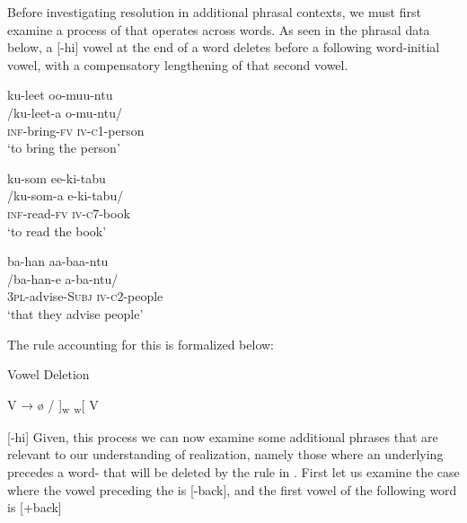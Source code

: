 \documentclass[output=paper,modfonts,nonflat,
 hidelinks
]{langsci/langscibook}
\begin{document}
Before investigating  resolution in additional phrasal contexts, we must first examine a process of  that operates across words. As seen in the phrasal data below, a [-hi] vowel at the end of a word deletes before a following word-initial vowel, with a compensatory lengthening of that second vowel.


\ea\label{ex:bickmore:16}
\ea\label{ex:bickmore:16a}
\glll ku-leet oo-muu-ntu  \\
      /ku-leet-a o-mu-ntu/\\
  \textsc{inf-}\textup{bring}\textsc{{}-fv} \textsc{iv-c1-}\textup{person}\\
\glt      ‘to bring the person’

\ex\label{ex:bickmore:16b}
\glll ku-som ee-ki-tabu\\        
/ku-som-a e-ki-tabu/\\
\textsc{inf-}\textup{read}\textsc{{}-fv} \textsc{iv-c7-}\textup{book}\\
\glt      ‘to read the book’

\ex\label{ex:bickmore:16c}
\glll ba-han aa-baa-ntu\\
/ba-han-e a-ba-ntu/\\
\textsc{3pl-}\textup{advise}\textsc{{}-Subj} \textsc{iv-c2-}\textup{people}\\
\glt      ‘that they advise people’
\z
\z

The rule accounting for this is formalized below:

\ea\label{ex:bickmore:17}
Vowel Deletion%
%

         V → ø / \underline{ }\underline{ }\underline{ } ]\textsubscript{w} \textsubscript{w}[ V  

      [-hi]
\z
Given, this process we can now examine some additional phrases that are relevant to our understanding of  realization, namely those where an underlying  precedes a word- that will be deleted by the rule in . First let us examine the case where the vowel preceding the  is [-back], and the first vowel of the following word is [+back]
\end{document}
